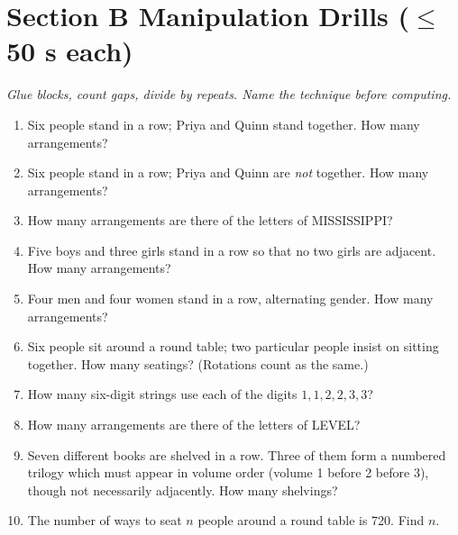 \documentclass[11pt,a4paper]{article}
\begin{document}
\section*{Section B \quad Manipulation Drills \hfill{\normalfont\small($\leq$50 s each)}}

\noindent\textit{Glue blocks, count gaps, divide by repeats. Name the technique before computing.}

\begin{enumerate}

\item Six people stand in a row; Priya and Quinn stand together. How many arrangements?

\item Six people stand in a row; Priya and Quinn are \emph{not} together. How many arrangements?

\item How many arrangements are there of the letters of MISSISSIPPI?

\item Five boys and three girls stand in a row so that no two girls are adjacent. How many arrangements?

\item Four men and four women stand in a row, alternating gender. How many arrangements?

\item Six people sit around a round table; two particular people insist on sitting together. How many seatings? (Rotations count as the same.)

\item How many six-digit strings use each of the digits $1,1,2,2,3,3$?

\item How many arrangements are there of the letters of LEVEL?

\item Seven different books are shelved in a row. Three of them form a numbered trilogy which must appear in volume order (volume 1 before 2 before 3), though not necessarily adjacently. How many shelvings?

\item The number of ways to seat $n$ people around a round table is 720. Find $n$.

\end{enumerate}
\end{document}
